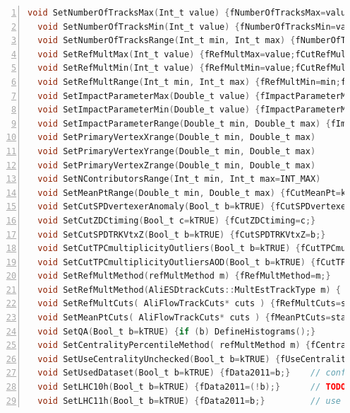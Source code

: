 \documentclass[a4paper]{book}
\numberwithin{equation}{subsection}
\begin{document}
\begin{lstlisting}[language=C, numbers=left]
  void SetNumberOfTracksMax(Int_t value) {fNumberOfTracksMax=value;fCutNumberOfTracks=kTRUE;}
  void SetNumberOfTracksMin(Int_t value) {fNumberOfTracksMin=value;fCutNumberOfTracks=kTRUE;}
  void SetNumberOfTracksRange(Int_t min, Int_t max) {fNumberOfTracksMin=min;fNumberOfTracksMax=max;fCutNumberOfTracks=kTRUE;}
  void SetRefMultMax(Int_t value) {fRefMultMax=value;fCutRefMult=kTRUE;}
  void SetRefMultMin(Int_t value) {fRefMultMin=value;fCutRefMult=kTRUE;}
  void SetRefMultRange(Int_t min, Int_t max) {fRefMultMin=min;fRefMultMax=max;fCutRefMult=kTRUE;}
  void SetImpactParameterMax(Double_t value) {fImpactParameterMax=value;fCutImpactParameter=kTRUE;}
  void SetImpactParameterMin(Double_t value) {fImpactParameterMin=value;fCutImpactParameter=kTRUE;}
  void SetImpactParameterRange(Double_t min, Double_t max) {fImpactParameterMin=min;fImpactParameterMax=max;fCutImpactParameter=kTRUE;}
  void SetPrimaryVertexXrange(Double_t min, Double_t max)
  void SetPrimaryVertexYrange(Double_t min, Double_t max)
  void SetPrimaryVertexZrange(Double_t min, Double_t max)
  void SetNContributorsRange(Int_t min, Int_t max=INT_MAX) 
  void SetMeanPtRange(Double_t min, Double_t max) {fCutMeanPt=kTRUE; fMeanPtMax=max; fMeanPtMin=min;}
  void SetCutSPDvertexerAnomaly(Bool_t b=kTRUE) {fCutSPDvertexerAnomaly=b;}
  void SetCutZDCtiming(Bool_t c=kTRUE) {fCutZDCtiming=c;}
  void SetCutSPDTRKVtxZ(Bool_t b=kTRUE) {fCutSPDTRKVtxZ=b;}
  void SetCutTPCmultiplicityOutliers(Bool_t b=kTRUE) {fCutTPCmultiplicityOutliers=b;}  
  void SetCutTPCmultiplicityOutliersAOD(Bool_t b=kTRUE) {fCutTPCmultiplicityOutliersAOD=b;}
  void SetRefMultMethod(refMultMethod m) {fRefMultMethod=m;}
  void SetRefMultMethod(AliESDtrackCuts::MultEstTrackType m) { fRefMultMethodAliESDtrackCuts=m; 
  void SetRefMultCuts( AliFlowTrackCuts* cuts ) {fRefMultCuts=static_cast<AliFlowTrackCuts*>(cuts->Clone());}
  void SetMeanPtCuts( AliFlowTrackCuts* cuts ) {fMeanPtCuts=static_cast<AliFlowTrackCuts*>(cuts->Clone());}
  void SetQA(Bool_t b=kTRUE) {if (b) DefineHistograms();}
  void SetCentralityPercentileMethod( refMultMethod m) {fCentralityPercentileMethod=m;}
  void SetUseCentralityUnchecked(Bool_t b=kTRUE) {fUseCentralityUnchecked=b;}
  void SetUsedDataset(Bool_t b=kTRUE) {fData2011=b;}    // confusing name, better use different interface
  void SetLHC10h(Bool_t b=kTRUE) {fData2011=(!b);}      // TODO let cut object determine runnumber and period
  void SetLHC11h(Bool_t b=kTRUE) {fData2011=b;}         // use this only as 'manual override'\end{lstlisting}
\end{document}
